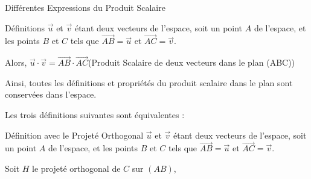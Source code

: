 \documentclass{coursbook}
\begin{document}
    \begin{Gpartie}{Différentes Expressions du Produit Scalaire} 
        \begin{Spartie}{Définitions} 
            $\vec{u}$ et $\vec{v}$ étant deux vecteurs de l'espace, soit un point $A$ de l'espace, et les points $B$ et $C$ tels que $\overrightarrow{AB}=\vec{u}$ et $\overrightarrow{AC}=\vec{v}$.

            Alors, $\vec{u}\cdot\vec{v}=\overrightarrow{AB}\cdot\overrightarrow{AC}$\quad(Produit Scalaire de deux vecteurs dans le plan (ABC))

            Ainsi, toutes les définitions et propriétés du produit scalaire dans le plan sont conservées dans l'espace.

            Les trois définitions suivantes sont équivalentes :
            \begin{SSpartie}{Définition avec le Projeté Orthogonal} 
                $\vec{u}$ et $\vec{v}$ étant deux vecteurs de l'espace, soit un point $A$ de l'espace, et les points $B$ et $C$ tels que $\overrightarrow{AB}=\vec{u}$ et $\overrightarrow{AC}=\vec{v}$.

                Soit $H$ le projeté orthogonal de $C$ sur $(AB)$,


\end{SSpartie}
\end{Spartie}
\end{Gpartie}
\end{document}
